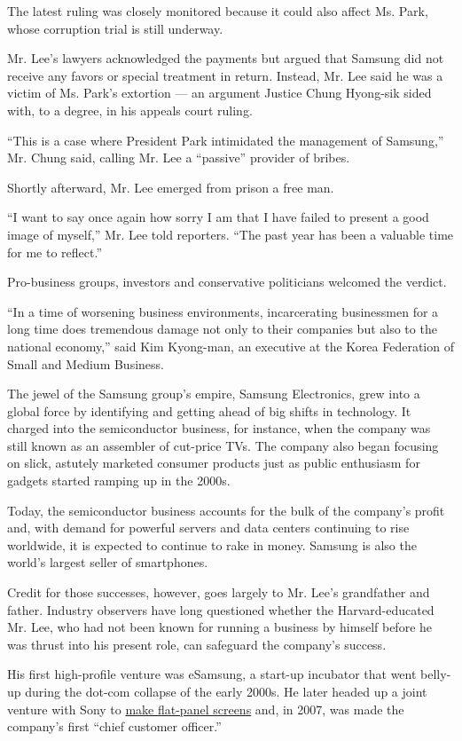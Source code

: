 The latest ruling was closely monitored because it could also affect Ms.
Park, whose corruption trial is still underway.

Mr. Lee's lawyers acknowledged the payments but argued that Samsung did
not receive any favors or special treatment in return. Instead, Mr. Lee
said he was a victim of Ms. Park's extortion --- an argument Justice
Chung Hyong-sik sided with, to a degree, in his appeals court ruling.

``This is a case where President Park intimidated the management of
Samsung,'' Mr. Chung said, calling Mr. Lee a ``passive'' provider of
bribes.

Shortly afterward, Mr. Lee emerged from prison a free man.

``I want to say once again how sorry I am that I have failed to present
a good image of myself,'' Mr. Lee told reporters. ``The past year has
been a valuable time for me to reflect.''

Pro-business groups, investors and conservative politicians welcomed the
verdict.

``In a time of worsening business environments, incarcerating
businessmen for a long time does tremendous damage not only to their
companies but also to the national economy,'' said Kim Kyong-man, an
executive at the Korea Federation of Small and Medium Business.

The jewel of the Samsung group's empire, Samsung Electronics, grew into
a global force by identifying and getting ahead of big shifts in
technology. It charged into the semiconductor business, for instance,
when the company was still known as an assembler of cut-price TVs. The
company also began focusing on slick, astutely marketed consumer
products just as public enthusiasm for gadgets started ramping up in the
2000s.

Today, the semiconductor business accounts for the bulk of the company's
profit and, with demand for powerful servers and data centers continuing
to rise worldwide, it is expected to continue to rake in money. Samsung
is also the world's largest seller of smartphones.

Credit for those successes, however, goes largely to Mr. Lee's
grandfather and father. Industry observers have long questioned whether
the Harvard-educated Mr. Lee, who had not been known for running a
business by himself before he was thrust into his present role, can
safeguard the company's success.

His first high-profile venture was eSamsung, a start-up incubator that
went belly-up during the dot-com collapse of the early 2000s. He later
headed up a joint venture with Sony to
\href{http://www.nytimes3xbfgragh.onion/2011/12/27/technology/sony-sells-stake-in-lcd-panel-joint-venture.html}{make
flat-panel screens} and, in 2007, was made the company's first ``chief
customer officer.''

